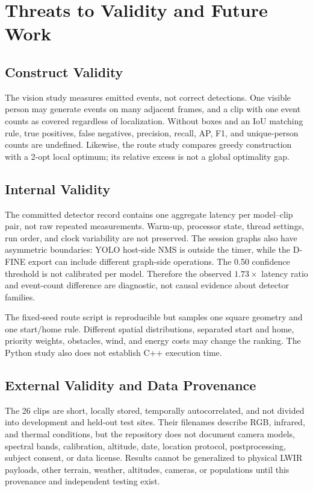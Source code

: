 \section{Threats to Validity and Future Work}

\subsection{Construct Validity}

The vision study measures emitted events, not correct detections. One visible person may generate events on many adjacent frames, and a clip with one event counts as covered regardless of localization. Without boxes and an IoU matching rule, true positives, false negatives, precision, recall, AP, F1, and unique-person counts are undefined. Likewise, the route study compares greedy construction with a 2-opt local optimum; its relative excess is not a global optimality gap.

\subsection{Internal Validity}

The committed detector record contains one aggregate latency per model--clip pair, not raw repeated measurements. Warm-up, processor state, thread settings, run order, and clock variability are not preserved. The session graphs also have asymmetric boundaries: YOLO host-side NMS is outside the timer, while the D-FINE export can include different graph-side operations. The 0.50 confidence threshold is not calibrated per model. Therefore the observed $1.73\times$ latency ratio and event-count difference are diagnostic, not causal evidence about detector families.

The fixed-seed route script is reproducible but samples one square geometry and one start/home rule. Different spatial distributions, separated start and home, priority weights, obstacles, wind, and energy costs may change the ranking. The Python study also does not establish C++ execution time.

\subsection{External Validity and Data Provenance}

The 26 clips are short, locally stored, temporally autocorrelated, and not divided into development and held-out test sites. Their filenames describe RGB, infrared, and thermal conditions, but the repository does not document camera models, spectral bands, calibration, altitude, date, location protocol, postprocessing, subject consent, or data license. Results cannot be generalized to physical LWIR payloads, other terrain, weather, altitudes, cameras, or populations until this provenance and independent testing exist.

